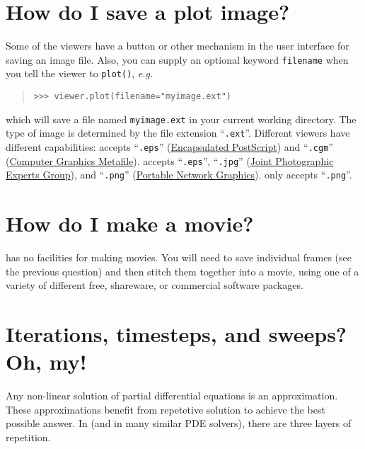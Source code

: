     \section{How do I save a plot image?} Some of the viewers have a
    button or other mechanism in the user interface for saving an
    image file. Also, you can supply an optional keyword
    \verb+filename+ when you tell the viewer to \verb+plot()+,
    \emph{e.g.}
    \begin{quote}
\begin{verbatim}
>>> viewer.plot(filename="myimage.ext")
\end{verbatim}
    \end{quote}
    which will save a file named \verb+myimage.ext+ in your current
    working directory. The type of image is determined by the file
    extension ``\verb+.ext+''. Different viewers have different
    capabilities: \Pygist{} accepts ``\verb+.eps+''
    (\href{http://en.wikipedia.org/wiki/Encapsulated_PostScript}{Encapsulated
    PostScript}) and ``\verb+.cgm+''
    (\href{http://xml.coverpages.org/cgm.html}{Computer Graphics
    Metafile}). \Matplotlib{} accepts ``\verb+.eps+'', ``\verb+.jpg+''
    (\href{http://www.jpeg.org/}{Joint Photographic Experts Group}),
    and ``\verb+.png+''
    (\href{http://www.w3.org/Graphics/PNG/}{Portable Network
    Graphics}). \MayaVi{} only accepts ``\verb+.png+''.

    \section{How do I make a movie?} \FiPy{} has no facilities for 
    making movies. You will need to save individual frames (see the 
    previous question) and then stitch them together into a movie, 
    using one of a variety of different free, shareware, or 
    commercial software packages.
    
    \section{Iterations, timesteps, and sweeps? Oh, my!} 
    \label{FAQ-IterationsTimestepsSweeps}
    Any non-linear solution of partial differential equations is an
    approximation. These approximations benefit from repetetive
    solution to achieve the best possible answer. In \FiPy{} (and in
    many similar PDE solvers), there are three layers of repetition.
    
